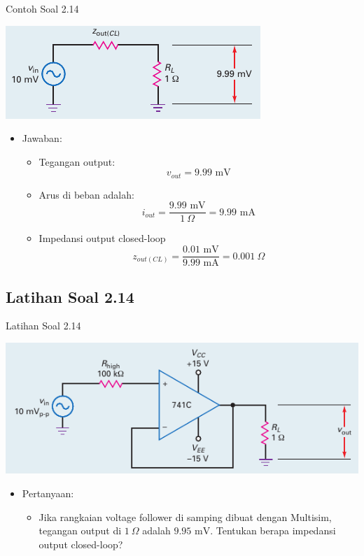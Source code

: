 \begin{frame}{Contoh Soal 2.14}
	\begin{multicols}{2}
		\begin{center}
			\includegraphics[width=\linewidth]{gambar/fig-16.26b}
		\end{center}
		\columnbreak
		\begin{itemize}
			\item Jawaban:
			\begin{itemize}
				\item Tegangan output:
				\[  v_{out} = 9.99 \text{ mV}  \]
				\item Arus di beban adalah:
				\[ i_{out} = \frac{9.99 \text{ mV}}{1~\Omega} = 9.99 \text{ mA} \]
				\item Impedansi output closed-loop
				\[ z_{out(CL)} = \frac{0.01 \text{ mV}}{9.99 \text{ mA}} = 0.001~\Omega \]
			\end{itemize}
		\end{itemize}
	\end{multicols}
\end{frame}

\subsection{Latihan Soal 2.14}
\begin{frame}{Latihan Soal 2.14}
	\begin{multicols}{2}
		\begin{center}
			\includegraphics[width=\linewidth]{gambar/fig-16.26a}
		\end{center}
		\columnbreak
		\begin{itemize}
			\item Pertanyaan:
			\begin{itemize}
				\item Jika rangkaian voltage follower di samping dibuat dengan Multisim, tegangan output di $ 1 ~\Omega $ adalah $ 9.95 \text{ mV} $. Tentukan berapa impedansi output closed-loop?
			\end{itemize}
		\end{itemize}
	\end{multicols}
\end{frame}

